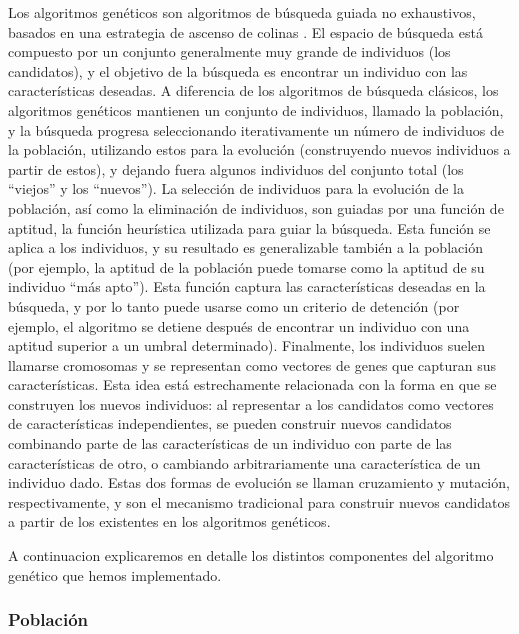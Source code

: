 Los algoritmos genéticos \cite{Goldberg:1989} son algoritmos de búsqueda guiada no exhaustivos, 
basados en una estrategia de ascenso de colinas \cite{Russell:2009}. El espacio de búsqueda está 
compuesto por un conjunto generalmente muy grande de individuos (los candidatos), y
el objetivo de la búsqueda es encontrar un individuo con las características deseadas. 
A diferencia de los algoritmos de búsqueda clásicos, los algoritmos genéticos mantienen un conjunto de individuos,
llamado la población, y la búsqueda progresa seleccionando iterativamente un número de individuos de la población, 
utilizando estos para la evolución (construyendo nuevos individuos a partir de estos), 
y dejando fuera algunos individuos del conjunto total (los ``viejos'' y los ``nuevos'').
La selección de individuos para la evolución de la población, así como la eliminación de individuos, 
son guiadas por una función de aptitud, la función heurística utilizada para guiar la búsqueda. 
Esta función se aplica a los individuos, y su resultado es generalizable también a la población 
(por ejemplo, la aptitud de la población puede tomarse como la aptitud de su individuo ``más apto'').
Esta función captura las características deseadas en la búsqueda, y por lo tanto puede usarse como un 
criterio de detención (por ejemplo, el algoritmo se detiene después de encontrar un individuo con una 
aptitud superior a un umbral determinado). Finalmente, los individuos suelen llamarse cromosomas y 
se representan como vectores de genes que capturan sus características. Esta idea está estrechamente relacionada 
con la forma en que se construyen los nuevos individuos: al representar a los candidatos como vectores de 
características independientes, se pueden construir nuevos candidatos combinando parte de las características 
de un individuo con parte de las características de otro, o cambiando arbitrariamente una característica de 
un individuo dado. Estas dos formas de evolución se llaman cruzamiento y mutación, respectivamente, y son el 
mecanismo tradicional para construir nuevos candidatos a partir de los existentes en los algoritmos genéticos. 

A continuacion explicaremos en detalle los distintos componentes del algoritmo genético que hemos implementado.

\subsubsection{Población}

